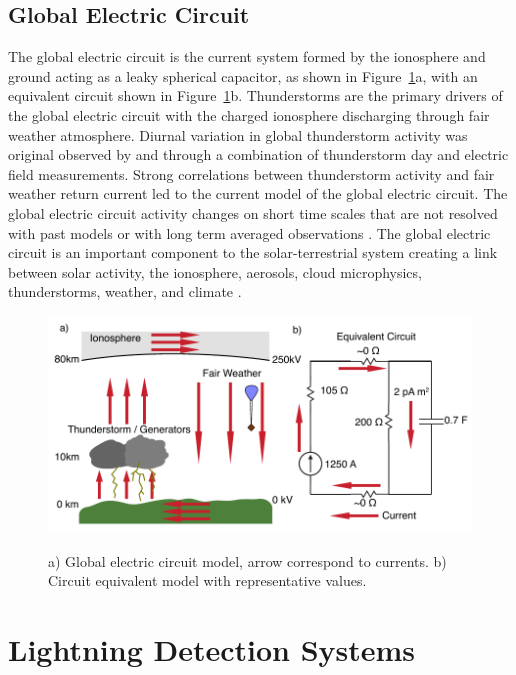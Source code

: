 \subsection{Global Electric Circuit}

The global electric circuit is the current system formed by the ionosphere and ground acting as a leaky spherical capacitor, as shown in Figure~\ref{intro:fig:gec}a, with an equivalent circuit shown in Figure~\ref{intro:fig:gec}b.
Thunderstorms are the primary drivers of the global electric circuit with the charged ionosphere discharging through fair weather atmosphere.
Diurnal variation in global thunderstorm activity was original observed by \citet{Wilson1921} and \citet{Whipple1929} through a combination of thunderstorm day and electric field measurements.
Strong correlations between thunderstorm activity and fair weather return current led to the current model of the global electric circuit.
The global electric circuit activity changes on short time scales that are not resolved with past models or with long term averaged observations \citep{Holzworth1984a}.
The global electric circuit is an important component to the solar-terrestrial system creating a link between solar activity, the ionosphere, aerosols, cloud microphysics, thunderstorms, weather, and climate \citep{Tinsley2007, Holzworth1986}.

\begin{figure}[ht!]
	\centering
	\includegraphics[scale=1]{Introduction/Figures/global_circuit.pdf}\\
	\caption{a) Global electric circuit model, arrow correspond to currents.
			b) Circuit equivalent model with representative values.}
	\label{intro:fig:gec}
\end{figure}

\section{Lightning Detection Systems}

